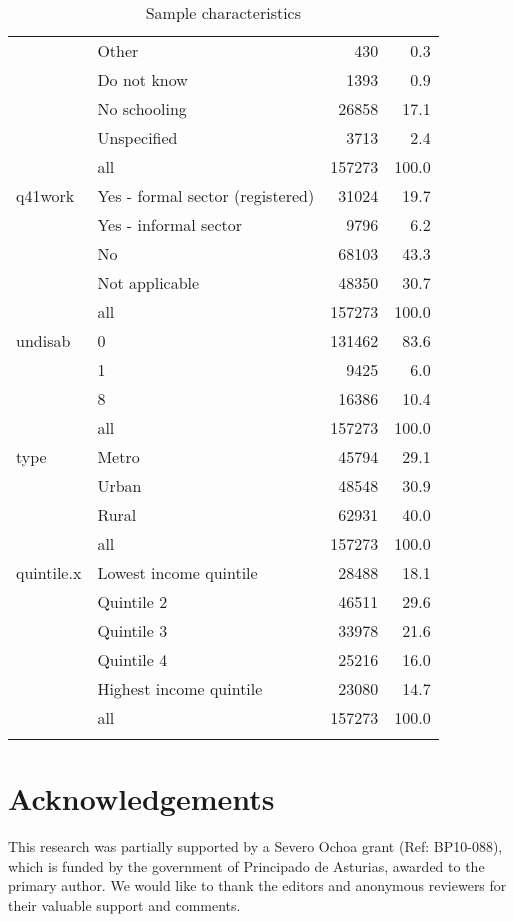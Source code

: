 \documentclass[preprint,review,authoryear, 3p,times]{elsarticle}\usepackage[]{graphicx}\usepackage[]{color}
\begin{document}
{\begin{longtable}{ll|rr}
   & Other & 430 & 0.3 \\ 
   & Do not know & 1393 & 0.9 \\ 
   & No schooling & 26858 & 17.1 \\ 
   & Unspecified & 3713 & 2.4 \\ 
   \hline
 & all & 157273 & 100.0 \\ 
   \hline
\hline
q41work & Yes - formal sector (registered) & 31024 & 19.7 \\ 
   & Yes - informal sector & 9796 & 6.2 \\ 
   & No & 68103 & 43.3 \\ 
   & Not applicable & 48350 & 30.7 \\ 
   \hline
 & all & 157273 & 100.0 \\ 
   \hline
\hline
undisab & 0 & 131462 & 83.6 \\ 
   & 1 & 9425 & 6.0 \\ 
   & 8 & 16386 & 10.4 \\ 
   \hline
 & all & 157273 & 100.0 \\ 
   \hline
\hline
type & Metro & 45794 & 29.1 \\ 
   & Urban & 48548 & 30.9 \\ 
   & Rural & 62931 & 40.0 \\ 
   \hline
 & all & 157273 & 100.0 \\ 
   \hline
\hline
quintile.x & Lowest income quintile & 28488 & 18.1 \\ 
   & Quintile 2 & 46511 & 29.6 \\ 
   & Quintile 3 & 33978 & 21.6 \\ 
   & Quintile 4 & 25216 & 16.0 \\ 
   & Highest income quintile & 23080 & 14.7 \\ 
   \hline
 & all & 157273 & 100.0 \\ 
   \hline
\hline
\hline
\caption{Sample characteristics} 
\label{tab: samplechar}
\end{longtable}
}




\section*{Acknowledgements}
This research was partially supported by a Severo Ochoa grant (Ref: BP10-088), which is funded by the government of Principado de Asturias, awarded to the primary author. We would like to thank the editors and anonymous reviewers for their valuable support and comments.


\newpage 


\end{document}
